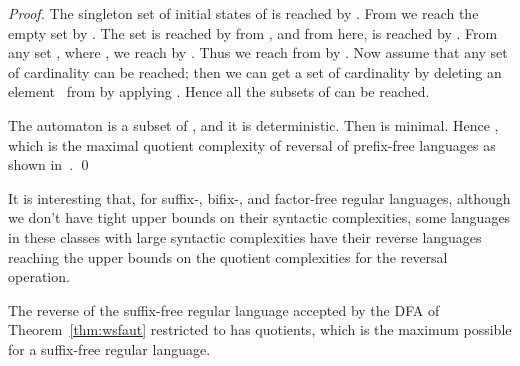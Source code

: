 \documentclass{llncs}
\begin{document}
\begin{proof}
The singleton set  of initial states  of  is reached by . From  we reach the empty set by . 
The set  is reached by  from , and from here,  is reached by . From any set , where , we reach 
 by . Thus we reach  from  by
.
Now assume that any set  of cardinality  can be reached; then we can get a set of cardinality  by deleting an element~ from  by applying 
. Hence all the subsets of   can be reached.

The automaton  is a subset of , and it is deterministic. Then  is minimal. Hence , which is the maximal quotient complexity of reversal of prefix-free languages as shown in~\cite{HSW09}. \qed
\end{proof} 




\medskip
It is interesting that, for suffix-, bifix-, and factor-free regular languages, although we don't have tight upper bounds on their syntactic complexities, some languages in these classes with large syntactic complexities have their reverse languages reaching the upper bounds on the quotient complexities for the reversal operation. 

\begin{theorem}\label{thm:sfrev}
The reverse of the suffix-free regular language accepted by the DFA  of Theorem~\ref{thm:wsfaut} restricted to  has  quotients, which is the maximum possible for a suffix-free regular language. 
\end{theorem}
\end{document}
